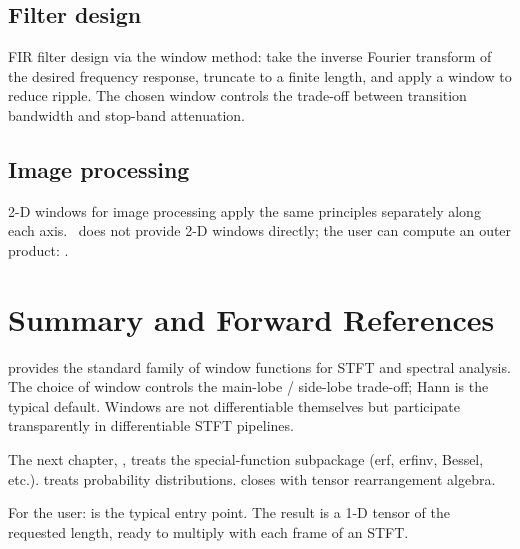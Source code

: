 \subsection{Filter design}
\label{ssec:signal_windows:filter_design}

FIR filter design via the window method: take the inverse
Fourier transform of the desired frequency response, truncate to
a finite length, and apply a window to reduce ripple. The chosen
window controls the trade-off between transition bandwidth and
stop-band attenuation.

\subsection{Image processing}
\label{ssec:signal_windows:image_proc}

2-D windows for image processing apply the same principles
separately along each axis. \Lucid\ does not provide 2-D windows
directly; the user can compute an outer product:
.

\section{Summary and Forward References}
\label{sec:signal_windows:summary}

 provides the standard family of
window functions for STFT and spectral analysis. The choice of
window controls the main-lobe / side-lobe trade-off; Hann is the
typical default. Windows are not differentiable themselves but
participate transparently in differentiable STFT pipelines.

The next chapter, , treats the
special-function subpackage (erf, erfinv, Bessel, etc.).
 treats probability distributions.
 closes  with
tensor rearrangement algebra.

\begin{lucidnote}
For the user:  is the
typical entry point. The result is a 1-D tensor of the requested
length, ready to multiply with each frame of an STFT.
\end{lucidnote}
